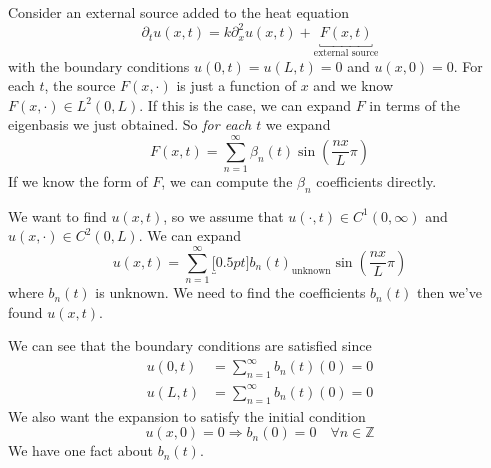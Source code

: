 \begin{ex}
Consider an external source added to the heat equation
\begin{equation}
\partial_{t}u(x,t) = k\partial^{2}_{x}u(x,t) +
\underbracket{F(x,t)}_{\text{external source}}
\end{equation}
with the boundary conditions $u(0,t)=u(L,t)=0$ and
$u(x,0)=0$. For each $t$, the source $F(x,\cdot)$ is just a
function of $x$ and we know $F(x,\cdot)\in L^{2}(0,L)$. If
this is the case, we can expand $F$ in terms of the
eigenbasis we just obtained. So \emph{for each $t$} we
expand
\begin{equation}
F(x,t) =
\sum^{\infty}_{n=1}\beta_{n}(t)\sin\left(\frac{nx}{L}\pi\right)
\end{equation}
If we know the form of $F$, we can compute the $\beta_n$
coefficients directly.

We want to find $u(x,t)$, so we assume that $u(\cdot,t)\in
C^{1}(0,\infty)$ and $u(x,\cdot)\in C^{2}(0,L)$. We can
expand
\begin{equation}
u(x,t) = \sum^{\infty}_{n=1}\underbracket[0.5pt]{b_{n}(t)}_{\text{unknown}}\sin\left(\frac{nx}{L}\pi\right)
\end{equation}
where $b_{n}(t)$ is unknown. We need to find the
coefficients $b_{n}(t)$ then we've found $u(x,t)$. 

We can see that the boundary conditions are satisfied since
\begin{subequations}
\begin{align}
u(0,t) &= \sum^{\infty}_{n=1}b_{n}(t)(0) = 0\\
u(L,t) &= \sum^{\infty}_{n=1}b_{n}(t)(0) = 0
\end{align}
\end{subequations}
We also want the expansion to satisfy the initial condition
\begin{equation}
u(x,0)=0\Rightarrow b_{n}(0)=0\quad \forall n\in\mathbb{Z}
\end{equation}
We have one fact about $b_{n}(t)$.


\end{ex}
